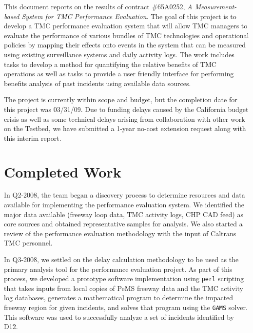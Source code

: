 
This document reports on the results of contract \#65A0252, \emph{A
  Measurement-based System for TMC Performance Evaluation}.  The goal of this
project is to develop a TMC performance evaluation system that will allow TMC
managers to evaluate the performance of various bundles of TMC technologies and
operational policies by mapping their effects onto events in the system that can
be measured using existing surveillance systems and daily activity logs.  The
work includes tasks to develop a method for quantifying the relative benefits of
TMC operations as well as tasks to provide a user friendly interface for
performing benefits analysis of past incidents using available data sources.

The project is currently within scope and budget, but the completion date for
this project was 03/31/09.  Due to funding delays caused by the California
budget crisis as well as some technical delays arising from collaboration with
other work on the Testbed, we have submitted a 1-year no-cost extension request
along with this interim report.

\section*{Completed Work}
\label{execsum-sum-of-work}

In Q2-2008, the team began a discovery process to determine resources and data
available for implementing the performance evaluation system. We identified the
major data available (freeway loop data, TMC activity logs, CHP CAD feed) as
core sources and obtained representative samples for analysis.  We also started
a review of the performance evaluation methodology with the input of Caltrans
TMC personnel.

In Q3-2008, we settled on the delay calculation methodology to be used as the
primary analysis tool for the performance evaluation project.  As part of this
process, we developed a prototype software implementation using \texttt{perl}
scripting that takes inputs from local copies of PeMS freeway data and the TMC
activity log databases, generates a mathematical program to determine the
impacted freeway region for given incidents, and solves that program using the
\texttt{GAMS} solver.  This software was used to successfully analyze a set of
incidents identified by D12.

